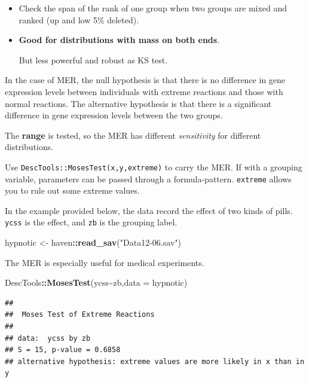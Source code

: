 \documentclass[
]{ctexart}
\newenvironment{Shaded}{\begin{snugshade}}{\end{snugshade}}
\newcommand{\AttributeTok}[1]{\textcolor[rgb]{0.13,0.29,0.53}{#1}}
\newcommand{\FunctionTok}[1]{\textcolor[rgb]{0.13,0.29,0.53}{\textbf{#1}}}
\newcommand{\NormalTok}[1]{#1}
\newcommand{\OtherTok}[1]{\textcolor[rgb]{0.56,0.35,0.01}{#1}}
\newcommand{\SpecialCharTok}[1]{\textcolor[rgb]{0.81,0.36,0.00}{\textbf{#1}}}
\newcommand{\StringTok}[1]{\textcolor[rgb]{0.31,0.60,0.02}{#1}}
\begin{document}
\begin{itemize}
\item
  Check the span of the rank of one group when two groups are mixed and
  ranked (up and low 5\% deleted).
\item
  \textbf{Good for distributions with mass on both ends}.

  But less powerful and robust as KS test.
\end{itemize}

In the case of MER, the null hypothesis is that there is no difference
in gene expression levels between individuals with extreme reactions and
those with normal reactions. The alternative hypothesis is that there is
a significant difference in gene expression levels between the two
groups.

The \textbf{range} is tested, so the MER has different
\emph{sensitivity} for different distributions.

Use \texttt{DescTools::MosesTest(x,y,extreme)} to carry the MER. If with
a grouping variable, parameters can be passed through a formula-pattern.
\texttt{extreme} allows you to rule out some extreme values.

In the example provided below, the data record the effect of two kinds
of pills. \texttt{ycss} is the effect, and \texttt{zb} is the grouping
label.

\begin{Shaded}
\begin{Highlighting}[]
\NormalTok{hypnotic }\OtherTok{\textless{}{-}}\NormalTok{ haven}\SpecialCharTok{::}\FunctionTok{read\_sav}\NormalTok{(}\StringTok{"Data12{-}06.sav"}\NormalTok{)}
\end{Highlighting}
\end{Shaded}

The MER is especially useful for medical experiments.

\begin{Shaded}
\begin{Highlighting}[]
\NormalTok{DescTools}\SpecialCharTok{::}\FunctionTok{MosesTest}\NormalTok{(ycss}\SpecialCharTok{\textasciitilde{}}\NormalTok{zb,}\AttributeTok{data =}\NormalTok{ hypnotic)}
\end{Highlighting}
\end{Shaded}

\begin{verbatim}
## 
##  Moses Test of Extreme Reactions
## 
## data:  ycss by zb
## S = 15, p-value = 0.6858
## alternative hypothesis: extreme values are more likely in x than in y
\end{verbatim}
\end{document}
